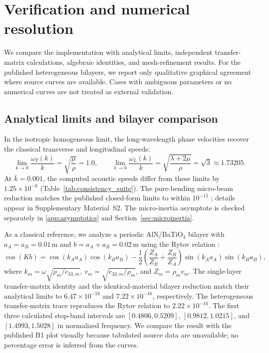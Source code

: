 \section{Verification and numerical resolution}
\label{sec:verification}

We compare the implementation with analytical limits, independent transfer-matrix calculations, algebraic identities, and mesh-refinement results. For the published heterogeneous bilayers, we report only qualitative graphical agreement where source curves are available. Cases with ambiguous parameters or no numerical curves are not treated as external validation.

\subsection{Analytical limits and bilayer comparison}
In the isotropic homogeneous limit, the long-wavelength phase velocities recover the classical transverse and longitudinal speeds:
\begin{equation}
\lim_{k\to0}\frac{\omega_T(k)}{k}=\sqrt{\frac{\mu}{\rho}}=1.0,\qquad
\lim_{k\to0}\frac{\omega_L(k)}{k}=\sqrt{\frac{\lambda+2\mu}{\rho}}=\sqrt{3}\approx1.73205.
\label{eq:acoustic_limits}
\end{equation}
At $\bar{k}=0.001$, the computed acoustic speeds differ from these limits by $1.25\times10^{-8}$ (Table~\ref{tab:consistency_suite}). The pure-bending micro-beam reduction matches the published closed-form limits to within $10^{-15}$ \cite{papargyribeskou2009}; details appear in Supplementary Material~S2. The micro-inertia asymptote is checked separately in \ref{app:asymptotics} and Section~\ref{sec:microinertia}.

As a classical reference, we analyze a periodic AlN/BaTiO$_3$ bilayer with $a_A=a_B=0.01\,\mathrm{m}$ and $b=a_A+a_B=0.02\,\mathrm{m}$ using the Rytov relation \cite{li2024anchorB,zhengwei2009}:
\begin{equation}
\cos(Kb)=\cos(k_Aa_A)\cos(k_Ba_B)-\frac{1}{2}\left(\frac{Z_A}{Z_B}+\frac{Z_B}{Z_A}\right)\sin(k_Aa_A)\sin(k_Ba_B),
\label{eq:rytov}
\end{equation}
where $k_m=\omega\sqrt{\rho_m/c_{33,m}}$, $v_m=\sqrt{c_{33,m}/\rho_m}$, and $Z_m=\rho_m v_m$. The single-layer transfer-matrix identity and the identical-material bilayer reduction match their analytical limits to $6.47\times10^{-16}$ and $7.22\times10^{-16}$, respectively. The heterogeneous transfer-matrix trace reproduces the Rytov relation to $2.22\times10^{-16}$. The first three calculated stop-band intervals are $[0.4806,0.5209]$, $[0.9812,1.0215]$, and $[1.4993,1.5028]$ in normalized frequency. We compare the result with the published B1 plot visually because tabulated source data are unavailable; no percentage error is inferred from the curves.

